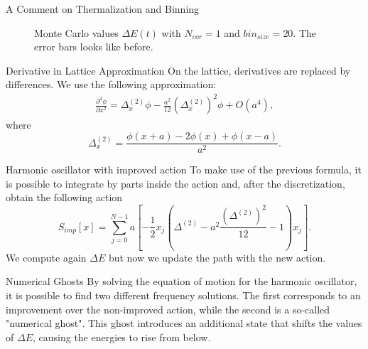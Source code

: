 \documentclass{beamer}
\begin{document}
\begin{frame}{A Comment on Thermalization and Binning}
\begin{figure}[ht]
\begin{minipage}[b]{0.4\linewidth}
        \caption{Monte Carlo values $\Delta E(t)$ with $N_{cor}=1$ and $bin_{size}=20$. The error bars looks like before.}
        \label{fig:harmonic_oscillator_with_low_thermalization_and_binning}
    \end{minipage}
    \end{figure}
\end{frame}

\begin{frame}{Derivative in Lattice Approximation}
    On the lattice, derivatives are replaced by differences. We use the following approximation:
    \begin{align*}
        \frac{\partial^2 \phi}{\partial x^2} = \Delta_x^{(2)} \phi - \frac{a^2}{12} \left( \Delta_x^{(2)} \right)^2 \phi + O(a^4),
    \end{align*}
    where
    \begin{equation*}
        \Delta_x^{(2)} = \frac{\phi(x+a) - 2\phi(x) + \phi(x-a)}{a^2}.
    \end{equation*}
\end{frame}

\begin{frame}{Harmonic oscillator with improved action}
    To make use of the previous formula, it is possible to integrate by parts inside the action and, after the discretization, obtain the following action
    \begin{equation*}
            S_{imp}[x] = \sum_{j=0}^{N-1} a  \left[-\frac{1}{2}x_j \left(\Delta^{(2)} -a^2 \frac{(\Delta^{(2)})^2}{12} -1 \right)x_j \right].
    \end{equation*}
    We compute again $\Delta E$ but now we update the path with the new action.
\end{frame}


\begin{frame}{Numerical Ghosts}
    By solving the equation of motion for the harmonic oscillator, it is possible to find two different frequency solutions. The first corresponds to an improvement over the non-improved action, while the second is a so-called "numerical ghost". This ghost introduces an additional state that shifts the values of $\Delta E$, causing the energies to rise from below.
\end{frame}
\end{document}
